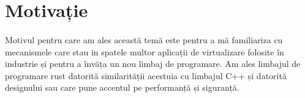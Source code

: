 \section{Motivație}
    \paragraph{} Motivul pentru care am ales această temă este pentru a mă familiariza cu mecanismele care stau in spatele multor aplicații de virtualizare folosite în industrie și pentru a învăța un nou limbaj de programare. Am ales limbajul de programare rust datorită similarității acestuia cu limbajul C++ și datorită designului sau care pune accentul pe performanță și siguranță. \cite{jung2017rustbelt}